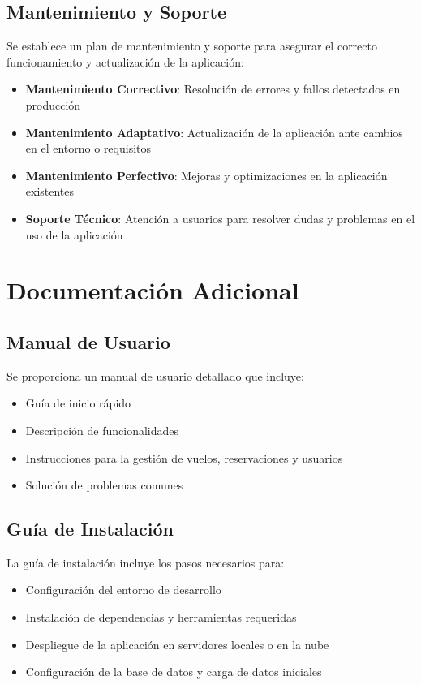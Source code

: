 \documentclass[12pt,a4paper]{article}
\begin{document}
\subsection{Mantenimiento y Soporte}

Se establece un plan de mantenimiento y soporte para asegurar el correcto funcionamiento y actualización de la aplicación:

\begin{itemize}
    \item \textbf{Mantenimiento Correctivo}: Resolución de errores y fallos detectados en producción
    \item \textbf{Mantenimiento Adaptativo}: Actualización de la aplicación ante cambios en el entorno o requisitos
    \item \textbf{Mantenimiento Perfectivo}: Mejoras y optimizaciones en la aplicación existentes
    \item \textbf{Soporte Técnico}: Atención a usuarios para resolver dudas y problemas en el uso de la aplicación
\end{itemize}

\section{Documentación Adicional}

\subsection{Manual de Usuario}

Se proporciona un manual de usuario detallado que incluye:

\begin{itemize}
    \item Guía de inicio rápido
    \item Descripción de funcionalidades
    \item Instrucciones para la gestión de vuelos, reservaciones y usuarios
    \item Solución de problemas comunes
\end{itemize}

\subsection{Guía de Instalación}

La guía de instalación incluye los pasos necesarios para:

\begin{itemize}
    \item Configuración del entorno de desarrollo
    \item Instalación de dependencias y herramientas requeridas
    \item Despliegue de la aplicación en servidores locales o en la nube
    \item Configuración de la base de datos y carga de datos iniciales
\end{itemize}
\end{document}
